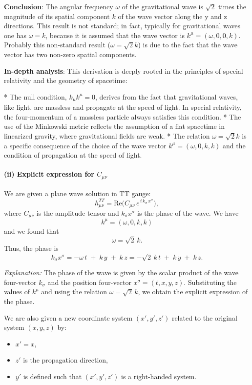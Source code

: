 \documentclass{article}
\begin{document}
\textbf{Conclusion}: The angular frequency $\omega$ of the gravitational wave is $\sqrt{2}$ times the magnitude of its spatial component $k$ of the wave vector along the y and z directions. This result is not standard; in fact, typically for gravitational waves one has $\omega=k$, because it is assumed that the wave vector is $k^{\mu} = (\omega, 0, 0, k)$. Probably this non-standard result ($\omega = \sqrt{2}k$) is due to the fact that the wave vector has two non-zero spatial components.

\textbf{In-depth analysis}: This derivation is deeply rooted in the principles of special relativity and the geometry of spacetime:

*   The null condition, $k_{\mu}k^{\mu}=0$, derives from the fact that gravitational waves, like light, are massless and propagate at the speed of light. In special relativity, the four-momentum of a massless particle always satisfies this condition.
*   The use of the Minkowski metric reflects the assumption of a flat spacetime in linearized gravity, where gravitational fields are weak.
*   The relation $\omega = \sqrt{2}k$ is a specific consequence of the choice of the wave vector $k^\mu = (\omega, 0, k, k)$ and the condition of propagation at the speed of light.

\paragraph{(ii) Explicit expression for \texorpdfstring{$C_{\mu \nu}$}{C\_µν}}

We are given a plane wave solution in TT gauge:
\[
h_{\mu \nu}^{TT} = \mathrm{Re}\bigl(C_{\mu \nu}\, e^{\,i\,k_{\sigma}\,x^{\sigma}}\bigr),
\]
where $C_{\mu \nu}$ is the amplitude tensor and $k_{\sigma}x^{\sigma}$ is the phase of the wave. We have
\[
k^{\mu} = (\omega, 0, k, k)
\]
and we found that
\[
\omega = \sqrt{2}\,k.
\]
Thus, the phase is
\begin{equation}
k_{\sigma}x^{\sigma} = -\omega\, t \;+\; k\,y \;+\; k\,z
= -\sqrt{2}\,k\,t \;+\; k\,y \;+\; k\,z.
\end{equation}

\textit{Explanation:}
The phase of the wave is given by the scalar product of the wave four-vector $k_{\sigma}$ and the position four-vector $x^{\sigma} = (t, x, y, z)$. Substituting the values of $k^{\mu}$ and using the relation $\omega = \sqrt{2}\,k$, we obtain the explicit expression of the phase.

We are also given a new coordinate system $(x', y', z')$ related to the original system $(x, y, z)$ by:
\begin{itemize}
    \item $x' = x$,
    \item $z'$ is the propagation direction,
    \item $y'$ is defined such that $(x', y', z')$ is a right-handed system.
\end{itemize}
\end{document}
